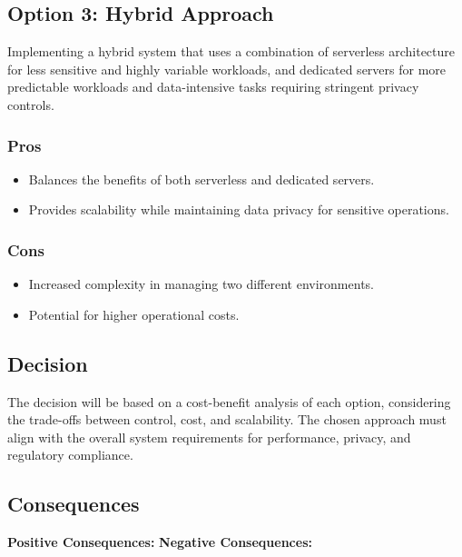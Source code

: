 \subsection*{Option 3: Hybrid Approach}
Implementing a hybrid system that uses a combination of serverless architecture for less sensitive and highly variable workloads, and dedicated servers for more predictable workloads and data-intensive tasks requiring stringent privacy controls.
\subsubsection*{Pros}
\begin{itemize}
    \item Balances the benefits of both serverless and dedicated servers.
    \item Provides scalability while maintaining data privacy for sensitive operations.
\end{itemize}
\subsubsection*{Cons}
\begin{itemize}
    \item Increased complexity in managing two different environments.
    \item Potential for higher operational costs.
\end{itemize}

\subsection*{Decision}
The decision will be based on a cost-benefit analysis of each option, considering the trade-offs between control, cost, and scalability. The chosen approach must align with the overall system requirements for performance, privacy, and regulatory compliance.

\subsection*{Consequences}
\textbf{Positive Consequences:}
\textbf{Negative Consequences:}
